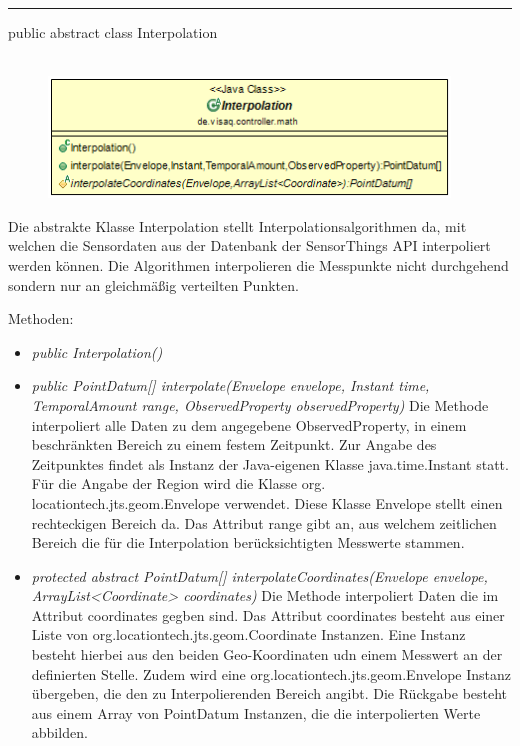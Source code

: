 \rule{\textwidth}{0.4pt}
public abstract class Interpolation
\\\\
\begin{minipage}{0.5\textwidth}
    \begin{figure}[H]
        {\centering\includegraphics[width=0.95\textwidth]{media/backend/controller/classes/Interpolation.png}}
    \end{figure}
    \end{minipage} \hfill
\begin{minipage}{0.5\textwidth}
    Die abstrakte Klasse Interpolation stellt Interpolationsalgorithmen da, mit welchen die Sensordaten aus der Datenbank der \gls{SensorThings API} interpoliert werden können.
    Die Algorithmen interpolieren die Messpunkte nicht durchgehend sondern nur an gleichmäßig verteilten Punkten.
\end{minipage}

Methoden:
\begin{itemize}
    \item \emph{public Interpolation()}
    \item \emph{public PointDatum[] interpolate(Envelope envelope, Instant time, TemporalAmount range, ObservedProperty observedProperty)}
    Die Methode interpoliert alle Daten zu dem angegebene ObservedProperty, in einem beschränkten Bereich zu einem festem Zeitpunkt.
    Zur Angabe des Zeitpunktes findet als Instanz der Java-eigenen Klasse java.time.Instant statt.
    Für die Angabe der Region wird die Klasse org. locationtech.jts.geom.Envelope verwendet.
    Diese Klasse Envelope stellt einen rechteckigen Bereich da.
    Das Attribut range gibt an, aus welchem zeitlichen Bereich die für die Interpolation berücksichtigten Messwerte stammen.
    \item \emph{protected abstract PointDatum[] interpolateCoordinates(Envelope envelope, ArrayList<Coordinate> coordinates)}
    Die Methode interpoliert Daten die im Attribut coordinates gegben sind.
    Das Attribut coordinates besteht aus einer Liste von org.locationtech.jts.geom.Coordinate Instanzen.
    Eine Instanz besteht hierbei aus den beiden Geo-Koordinaten udn einem Messwert an der definierten Stelle.
    Zudem wird eine org.locationtech.jts.geom.Envelope Instanz übergeben, die den zu Interpolierenden Bereich angibt.
    Die Rückgabe besteht aus einem Array von PointDatum Instanzen, die die interpolierten Werte abbilden.
\end{itemize}


